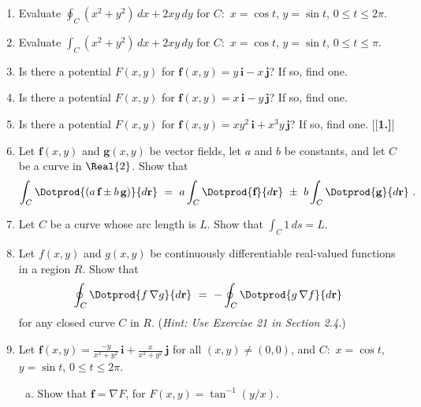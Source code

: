 \section*{}\begin{multicols}{2}\columnseprule 1pt \columnsep 25pt
\begin{enumerate}[\bfseries 1.]
 \item Evaluate $\displaystyle\oint_C (x^2 + y^2 )\,dx + 2xy\,dy$ for $C:$ $x=\cos t$, $y=\sin t$, $0\le t\le 2\pi$.
 \item Evaluate $\displaystyle\int_C (x^2 + y^2 )\,dx + 2xy\,dy$ for $C:$ $x=\cos t$, $y=\sin t$, $0\le t\le \pi$.
 \item Is there a potential $F(x,y)$ for $\textbf{f}(x,y) = y\,\textbf{i} - x\,\textbf{j}$? If so, find one.
 \item Is there a potential $F(x,y)$ for $\textbf{f}(x,y) = x\,\textbf{i} - y\,\textbf{j}$? If so, find one.
 \item Is there a potential $F(x,y)$ for $\textbf{f}(x,y) = xy^2\,\textbf{i} + x^3 y\,\textbf{j}$? If so, find
  one.
[{[\bfseries 1.]}]
 \item Let $\textbf{f}(x,y)$ and $\textbf{g}(x,y)$ be vector fields, let $a$ and $b$ be constants, and let $C$ be
  a curve in $\Real{2}$. Show that
  \begin{displaymath}
   \int_{C}\Dotprod{(a\,\textbf{f} \pm b\,\textbf{g})}{d\textbf{r}} ~=~ a \int_{C}\Dotprod{\textbf{f}}{d\textbf{r}} ~\pm~
   b \int_{C}\Dotprod{\textbf{g}}{d\textbf{r}} ~.
  \end{displaymath}
 \item Let $C$ be a curve whose arc length is $L$. Show that $\int_C 1\,ds = L$.
 \item Let $f(x,y)$ and $g(x,y)$ be continuously differentiable real-valued functions in a region $R$. Show that
  \begin{displaymath}
   \oint_{C}\Dotprod{f\,\nabla g}{d\textbf{r}} ~=~ -\oint_{C}\Dotprod{g\,\nabla f}{d\textbf{r}}
  \end{displaymath}
  for any closed curve $C$ in $R$. (\emph{Hint: Use Exercise 21 in Section 2.4.})
 \item Let $\textbf{f}(x,y)=\frac{-y}{x^2 + y^2}\,\textbf{i} + \frac{x}{x^2 + y^2}\,\textbf{j}$ for all $(x,y)\ne(0,0)$,
  and $C:$ $x=\cos t$, $y=\sin t$, $0\le t\le 2\pi$.
  \begin{enumerate}[(a)]
   \item Show that $\textbf{f} = \nabla F$, for $F(x,y) = \tan^{-1}(y/x)$.

\end{enumerate}
\end{enumerate}
\end{multicols}
